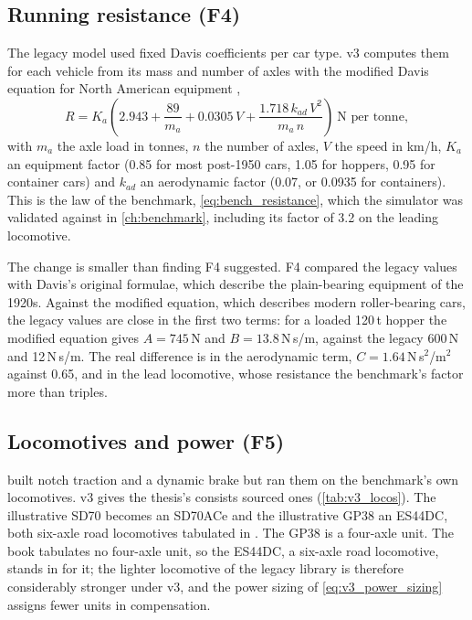 \subsection{Running resistance (F4)}

The legacy model used fixed Davis coefficients per car type. v3 computes them for each vehicle from its mass and number of axles with the modified Davis equation for North American equipment \cite[Table~13.3]{Cole2019HandbookLTD},
\begin{equation}
    R = K_a\left(2.943 + \frac{89}{m_a} + 0.0305\,V + \frac{1.718\,k_{ad}\,V^2}{m_a\,n}\right)\ \text{N per tonne},
    \label{eq:v3_modified_davis}
\end{equation}
with $m_a$ the axle load in tonnes, $n$ the number of axles, $V$ the speed in km/h, $K_a$ an equipment factor (0.85 for most post-1950 cars, 1.05 for hoppers, 0.95 for container cars) and $k_{ad}$ an aerodynamic factor (0.07, or 0.0935 for containers). This is the law of the benchmark, \cref{eq:bench_resistance}, which the simulator was validated against in \cref{ch:benchmark}, including its factor of 3.2 on the leading locomotive.

The change is smaller than finding F4 suggested. F4 compared the legacy values with Davis's original formulae, which describe the plain-bearing equipment of the 1920s. Against the modified equation, which describes modern roller-bearing cars, the legacy values are close in the first two terms: for a loaded 120\,t hopper the modified equation gives $A = 745$\,N and $B = 13.8$\,N\,s/m, against the legacy 600\,N and 12\,N\,s/m. The real difference is in the aerodynamic term, $C = 1.64$\,N\,s$^2$/m$^2$ against 0.65, and in the lead locomotive, whose resistance the benchmark's factor more than triples.

\subsection{Locomotives and power (F5)}

 built notch traction and a dynamic brake but ran them on the benchmark's own locomotives. v3 gives the thesis's consists sourced ones (\cref{tab:v3_locos}). The illustrative SD70 becomes an SD70ACe and the illustrative GP38 an ES44DC, both six-axle road locomotives tabulated in \cite[Ch.~2]{Spiryagin2017HeavyHaul}. The GP38 is a four-axle unit. The book tabulates no four-axle unit, so the ES44DC, a six-axle road locomotive, stands in for it; the lighter locomotive of the legacy library is therefore considerably stronger under v3, and the power sizing of \cref{eq:v3_power_sizing} assigns fewer units in compensation.

